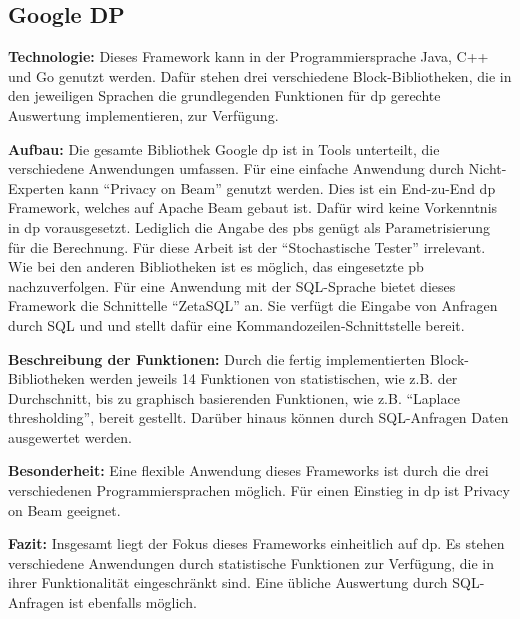 \subsection{Google DP}
\textbf{Technologie: }
Dieses Framework \parencite{DPGoogle} kann in der Programmiersprache Java, C++ und Go genutzt werden. Dafür stehen drei verschiedene Block-Bibliotheken, die in den jeweiligen Sprachen die grundlegenden Funktionen für \gls{dp} gerechte Auswertung implementieren, zur Verfügung.

\textbf{Aufbau: }
Die gesamte Bibliothek Google \gls{dp} ist in Tools unterteilt, die verschiedene Anwendungen umfassen.
Für eine einfache Anwendung durch Nicht-Experten kann \enquote{Privacy on Beam} genutzt werden. Dies ist ein End-zu-End \gls{dp} Framework, welches auf Apache Beam gebaut ist. Dafür wird keine Vorkenntnis in \gls{dp} vorausgesetzt. Lediglich die Angabe des \gls{pb}s genügt als Parametrisierung für die Berechnung. Für diese Arbeit ist der \enquote{Stochastische Tester} irrelevant. Wie bei den anderen Bibliotheken ist es möglich, das eingesetzte \gls{pb} nachzuverfolgen. Für eine Anwendung mit der SQL-Sprache bietet dieses Framework die Schnittelle \enquote{ZetaSQL} an. Sie verfügt die Eingabe von Anfragen durch SQL und und stellt dafür eine Kommandozeilen-Schnittstelle bereit.

\textbf{Beschreibung der Funktionen: }
Durch die fertig implementierten Block-Bibliotheken werden jeweils 14 Funktionen von statistischen, wie z.B. der Durchschnitt, bis zu graphisch basierenden Funktionen, wie z.B. \enquote{Laplace thresholding}, bereit gestellt. Darüber hinaus können durch SQL-Anfragen Daten ausgewertet werden.

\textbf{Besonderheit: }
Eine flexible Anwendung dieses Frameworks ist durch die drei verschiedenen Programmiersprachen möglich. Für einen Einstieg in \gls{dp} ist Privacy on Beam geeignet.

\textbf{Fazit: }
Insgesamt liegt der Fokus dieses Frameworks einheitlich auf \gls{dp}. Es stehen verschiedene Anwendungen durch statistische Funktionen zur Verfügung, die in ihrer Funktionalität eingeschränkt sind. Eine übliche Auswertung durch SQL-Anfragen ist ebenfalls möglich.

\newpage
